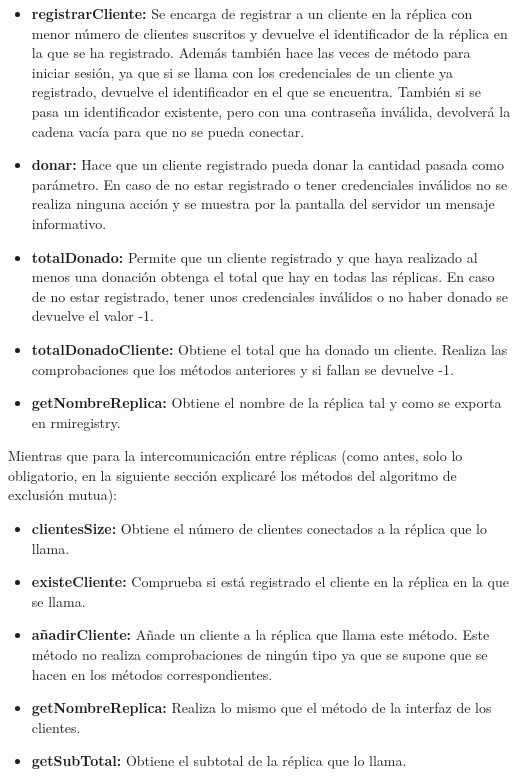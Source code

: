 \documentclass{article}
\begin{document}
\begin{itemize}
    \item \textbf{registrarCliente: }Se encarga de registrar a un cliente en la réplica con menor número de clientes suscritos y devuelve el identificador de la réplica en la que se ha registrado. Además también hace las veces de método para iniciar sesión, ya que si se llama con los credenciales de un cliente ya registrado, devuelve el identificador en el que se encuentra. También si se pasa un identificador existente, pero con una contraseña inválida, devolverá la cadena vacía para que no se pueda conectar.
    
    \item \textbf{donar: }Hace que un cliente registrado pueda donar la cantidad pasada como parámetro. En caso de no estar registrado o tener credenciales inválidos no se realiza ninguna acción y se muestra por la pantalla del servidor un mensaje informativo.

    \item \textbf{totalDonado: }Permite que un cliente registrado y que haya realizado al menos una donación obtenga el total que hay en todas las réplicas. En caso de no estar registrado, tener unos credenciales inválidos o no haber donado se devuelve el valor -1.
    
    \item \textbf{totalDonadoCliente: }Obtiene el total que ha donado un cliente. Realiza las comprobaciones que los métodos anteriores y si fallan se devuelve -1.\
    
    \item \textbf{getNombreReplica: }Obtiene el nombre de la réplica tal y como se exporta en rmiregistry.
\end{itemize}

Mientras que para la intercomunicación entre réplicas (como antes, solo lo obligatorio, en la siguiente sección explicaré los métodos del algoritmo de exclusión mutua):

\begin{itemize}
    \item \textbf{clientesSize: }Obtiene el número de clientes conectados a la réplica que lo llama.
    \item \textbf{existeCliente: }Comprueba si está registrado el cliente en la réplica en la que se llama.
    \item \textbf{añadirCliente: }Añade un cliente a la réplica que llama este método. Este método no realiza comprobaciones de ningún tipo ya que se supone que se hacen en los métodos correspondientes.
    \item \textbf{getNombreReplica: }Realiza lo mismo que el método de la interfaz de los clientes.
    \item \textbf{getSubTotal: }Obtiene el subtotal de la réplica que lo llama.
\end{itemize}
\end{document}
